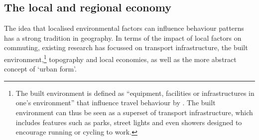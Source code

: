 \documentclass[a4paper, 11pt, twoside]{Thesis}
\begin{document}
\subsection{The local and regional economy}
The idea that localised environmental factors can
influence behaviour patterns has a strong tradition
in geography.
In terms of the impact of local factors on commuting, existing
research has focussed on transport infrastructure, the built
environment,\footnote{The
built environment is defined as ``equipment, facilities or infrastructures in
one's environment'' that influence travel behaviour by \citet[p.~2]{Lemieux2009}.
The built environment can thus be seen as a superset of transport infrastructure,
which includes features such as parks, street lights and even showers designed
to encourage running or cycling to work.
}
topography and local economies, as well as the more abstract concept of
`urban form'.
\end{document}
